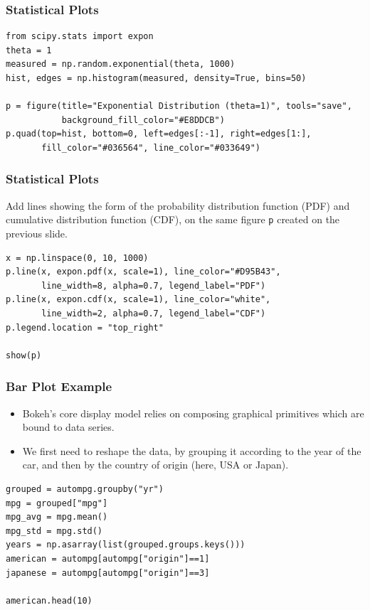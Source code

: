 \begin{frame}[fragile] \frametitle{Statistical Plots}
\begin{lstlisting}
from scipy.stats import expon
theta = 1
measured = np.random.exponential(theta, 1000)
hist, edges = np.histogram(measured, density=True, bins=50)

p = figure(title="Exponential Distribution (theta=1)", tools="save",
           background_fill_color="#E8DDCB")
p.quad(top=hist, bottom=0, left=edges[:-1], right=edges[1:],
       fill_color="#036564", line_color="#033649")
\end{lstlisting}
\end{frame}

\begin{frame}[fragile] \frametitle{Statistical Plots}
Add lines showing the form of the probability distribution function (PDF) and cumulative distribution function (CDF), on the same figure \texttt{p} created on the previous slide.
\begin{lstlisting}
x = np.linspace(0, 10, 1000)
p.line(x, expon.pdf(x, scale=1), line_color="#D95B43",
       line_width=8, alpha=0.7, legend_label="PDF")
p.line(x, expon.cdf(x, scale=1), line_color="white",
       line_width=2, alpha=0.7, legend_label="CDF")
p.legend.location = "top_right"

show(p)
\end{lstlisting}
\end{frame}

\begin{frame}[fragile] \frametitle{Bar Plot Example}
\begin{itemize}
\item Bokeh's core display model relies on composing graphical primitives which are bound to data series.
\item We first need to reshape the data, by grouping it according to the year of the car, and then by the country of origin (here, USA or Japan).
\end{itemize}
\begin{lstlisting}
grouped = autompg.groupby("yr")
mpg = grouped["mpg"]
mpg_avg = mpg.mean()
mpg_std = mpg.std()
years = np.asarray(list(grouped.groups.keys()))
american = autompg[autompg["origin"]==1]
japanese = autompg[autompg["origin"]==3]

american.head(10)
\end{lstlisting}
\end{frame}


